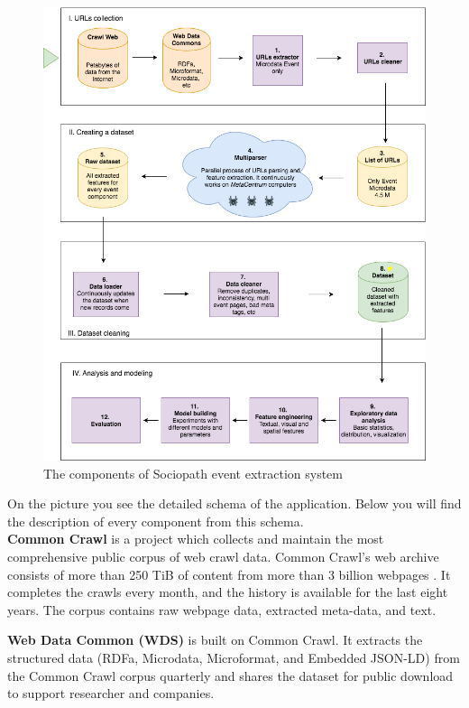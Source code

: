 \begin{figure}[h]
\begin{center}
\includegraphics[width=1.0\textwidth]{figures04/Architecure}
\caption{The components of Sociopath event extraction system}
\label{fig:architecture}
\end{center}
\end{figure}

On the picture  you see the detailed schema of the application. Below you will find the description of every component from this schema.\\

\textbf{Common Crawl} is a project which collects and maintain the most comprehensive public corpus of web crawl data. Common Crawl's web archive consists of more than 250 TiB of content from more than 3 billion webpages \cite{commoncrawl}. It completes the crawls every month, and the history is available for the last eight years. The corpus contains raw webpage data, extracted meta-data, and text.

\textbf{Web Data Common (WDS)}\cite{webdatacommons} is built on Common Crawl. It extracts the structured data (RDFa, Microdata, Microformat, and Embedded JSON-LD) from the Common Crawl corpus quarterly and shares the dataset for public download to support researcher and companies. 

